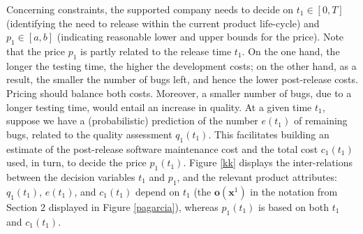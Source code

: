 \documentclass[a4paper,fleqn, 11pt]{cas-sc}
\begin{document}
   Concerning constraints, the supported company needs to decide on $t_1 \in [0,T]$ 
  (identifying the need to release within the current product life-cycle)
 and $p_1 \in [a, b]$ (indicating reasonable lower and upper bounds for the price). %
  Note that the price $p_1$ is partly related to the release time $t_1$. 
   On the one hand, the longer the testing time, 
  the higher the development costs; on the other hand, as a result, the smaller the number of bugs left, and hence the lower post-release costs. Pricing should balance both costs.  Moreover, a smaller number of bugs, due to a longer testing time, would entail an increase in quality. At a given time $t_1$, suppose we have a (probabilistic) prediction of the number $e(t_1)$ of remaining bugs, related to the quality assessment $q_1(t_1)$. This facilitates building an estimate of the post-release software maintenance cost and the total cost $c_1(t_1)$ used, in turn, to decide the price $p_1(t_1)$. Figure \ref{kk} displays  the inter-relations between the decision variables $t_1$ and $p_1$, and the relevant product attributes: %
   $q_1(t_1)$, $e(t_1)$, and $c_1(t_1)$ depend on $t_1$ (the ${\bm o} ({\bm x}^1)$ in the notation from  Section 2 displayed in Figure \ref{pagarcia}), whereas 
   $p_1(t_1)$ is based on both $t_1$ and $c_1(t_1)$. 
\end{document}
